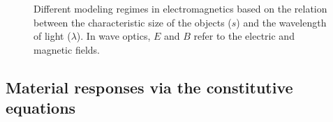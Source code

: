 \begin{figure}[tb]
   \centering

   \caption{Different modeling regimes in electromagnetics based on the
       relation between the characteristic size of the objects ($s$) and the
       wavelength of light ($\lambda$). In wave optics, $E$ and $B$ refer to
       the electric and magnetic fields.}
   \label{fig:EM_regime}
\end{figure}

\subsection*{Material responses via the constitutive equations}

